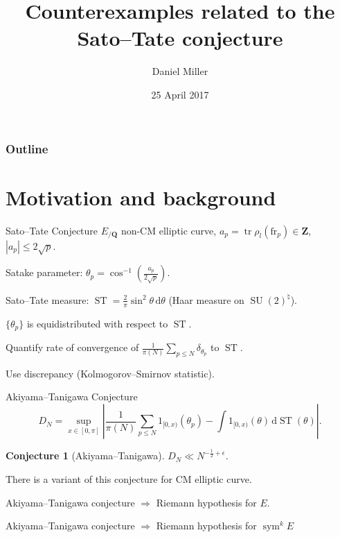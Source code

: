\documentclass[handout]{beamer}
\title{Counterexamples related to the Sato--Tate conjecture}
\author{Daniel Miller}
\institute{Cornell University}
\date{25 April 2017}
\DeclareMathOperator{\ST}{ST}
\DeclareMathOperator{\SU}{SU}
\DeclareMathOperator{\sym}{sym}
\DeclareMathOperator{\tr}{tr}
\newcommand{\bQ}{\mathbf{Q}}
\newcommand{\bZ}{\mathbf{Z}}
\newcommand{\dd}{\mathrm{d}}
\newcommand{\frob}{\mathrm{fr}}
\newtheorem{conjecture}{Conjecture}
\begin{document}
\begin{frame}
\titlepage
\end{frame}

\begin{frame}
\frametitle{Outline}
\tableofcontents
\end{frame}





\section{Motivation and background}

\begin{frame}{Sato--Tate Conjecture}
$E_{/\bQ}$ non-CM elliptic curve, $a_p = \tr\rho_l(\frob_p)\in \bZ$, 
$|a_p|\leqslant 2\sqrt p$. 
\pause

Satake parameter: $\theta_p = \cos^{-1}\left( \frac{a_p}{2\sqrt p}\right)$. 
\pause

Sato--Tate measure: $\ST = \frac{2}{\pi} \sin^2 \theta\, \dd \theta$ (Haar 
measure on $\SU(2)^\natural$). 
\pause

\begin{theorem}[Taylor et.~al.]
$\{\theta_p\}$ is equidistributed with respect to $\ST$. 
\end{theorem}
\pause

Quantify rate of convergence of 
$\frac{1}{\pi(N)} \sum_{p\leqslant N} \delta_{\theta_p}$ to $\ST$. 
\pause

Use discrepancy (Kolmogorov--Smirnov statistic). 
\end{frame}


\begin{frame}{Akiyama--Tanigawa Conjecture}
\[
	D_N = \sup_{x\in [0,\pi]}\left| \frac{1}{\pi(N)} \sum_{p\leqslant N} 1_{[0,x)}(\theta_p) - \int 1_{[0,x)}(\theta) \, \dd\ST(\theta)\right| .
\]
\pause

\begin{conjecture}[Akiyama--Tanigawa]
$D_N \ll N^{-\frac 1 2 + \epsilon}$. 
\end{conjecture}
\pause

There is a variant of this conjecture for CM elliptic curve.
\pause

\begin{theorem}
Akiyama--Tanigawa conjecture $\Rightarrow$ Riemann hypothesis for $E$.
\end{theorem}
\pause

\begin{theorem}[Mazur]
Akiyama--Tanigawa conjecture $\Rightarrow$ Riemann hypothesis for $\sym^k E$
\end{theorem}
\end{frame}
\end{document}
